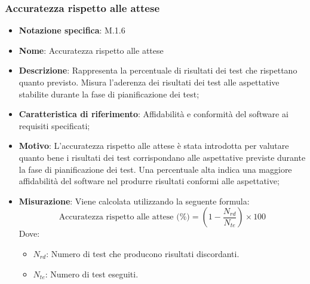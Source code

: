 \subsubsection{Accuratezza rispetto alle attese}
\begin{itemize}
    \item \textbf{Notazione specifica}: M.1.6
    \item \textbf{Nome}: Accuratezza rispetto alle attese
    \item \textbf{Descrizione}: Rappresenta la percentuale di risultati dei test che rispettano quanto previsto. Misura l'aderenza dei risultati dei test alle aspettative stabilite durante la fase di pianificazione dei test;
    \item \textbf{Caratteristica di riferimento}: Affidabilità e conformità del software ai requisiti specificati;
    \item \textbf{Motivo}: L'accuratezza rispetto alle attese è stata introdotta per valutare quanto bene i risultati dei test corrispondano alle aspettative previste durante la fase di pianificazione dei test. Una percentuale alta indica una maggiore affidabilità del software nel produrre risultati conformi alle aspettative;
    \item \textbf{Misurazione}: Viene calcolata utilizzando la seguente formula:
    \[
    \text{Accuratezza rispetto alle attese (\%)} = \left(1 - \frac{N_{rd}}{N_{te}}\right) \times 100
    \]
    Dove:
    \begin{itemize}
        \item $N_{rd}$: Numero di test che producono risultati discordanti.
        \item $N_{te}$: Numero di test eseguiti.
    \end{itemize} 
\end{itemize}
